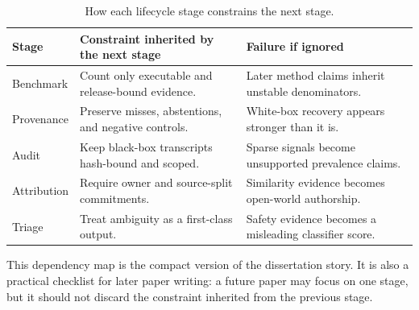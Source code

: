 \begin{table}[htbp]
\centering
\caption{How each lifecycle stage constrains the next stage.}
\label{tab:lifecycle-dependency-map}
\tighttable
\begin{tabularx}{\textwidth}{@{}L{1.85cm}YY@{}}
\toprule
Stage & Constraint inherited by the next stage & Failure if ignored \\
\midrule
Benchmark & Count only executable and release-bound evidence. & Later method claims inherit unstable denominators. \\
Provenance & Preserve misses, abstentions, and negative controls. & White-box recovery appears stronger than it is. \\
Audit & Keep black-box transcripts hash-bound and scoped. & Sparse signals become unsupported prevalence claims. \\
Attribution & Require owner and source-split commitments. & Similarity evidence becomes open-world authorship. \\
Triage & Treat ambiguity as a first-class output. & Safety evidence becomes a misleading classifier score. \\
\bottomrule
\end{tabularx}
\end{table}

This dependency map is the compact version of the dissertation story. It is also a practical checklist for later paper writing: a future paper may focus on one stage, but it should not discard the constraint inherited from the previous stage.
